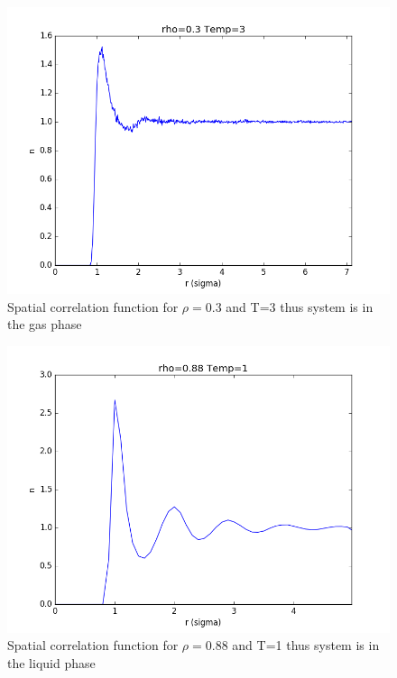 \documentclass[12pt,a4paper]{report}
\begin{document}
\begin{figure}[H]
\centering
\includegraphics[scale=0.5]{Correlation_rho03_T3_rm35_2.png}
\caption{Spatial correlation function for $\rho =0.3$ and T=3 thus system is in the gas phase}
\label{fig:gas_cor}
\end{figure}

\begin{figure}[H]
\centering
\includegraphics[scale=0.5]{Correlation_rho088_T1_rm35_2.png}
\caption{Spatial correlation function for $\rho =0.88$ and T=1 thus system is in the liquid phase}
\label{fig:liq_cor}
\end{figure}
\end{document}
